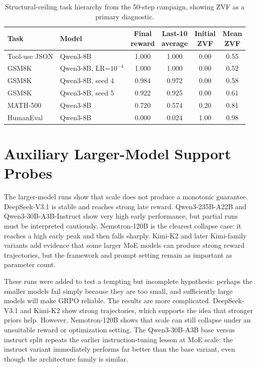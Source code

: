 \documentclass[12pt,a4paper]{report}
\begin{document}
\begin{table}[ht]
\centering
\caption{Structural-ceiling task hierarchy from the 50-step campaign, showing ZVF as a primary diagnostic.}
\label{tab:task-hierarchy}
\small
\setlength{\tabcolsep}{3pt}
\begin{tabular}{@{}p{}p{}cccc@{}}
\toprule
Task & Model & \shortstack{Final\\reward} & \shortstack{Last-10\\average} & \shortstack{Initial\\ZVF} & \shortstack{Mean\\ZVF}\\
\midrule
Tool-use JSON & Qwen3-8B & 1.000 & 1.000 & 0.00 & 0.55\\
GSM8K & Qwen3-8B, LR=$10^{-4}$ & 1.000 & 1.000 & 0.00 & 0.52\\
GSM8K & Qwen3-8B, seed 4 & 0.984 & 0.972 & 0.00 & 0.58\\
GSM8K & Qwen3-8B, seed 5 & 0.922 & 0.925 & 0.00 & 0.61\\
MATH-500 & Qwen3-8B & 0.720 & 0.574 & 0.20 & 0.81\\
HumanEval & Qwen3-8B & 0.000 & 0.024 & 1.00 & 0.98\\
\bottomrule
\end{tabular}
\end{table}

\section{Auxiliary Larger-Model Support Probes}
\label{sec:world-class}

The larger-model runs show that scale does not produce a monotonic guarantee. DeepSeek-V3.1 is stable and reaches strong late reward. Qwen3-235B-A22B and Qwen3-30B-A3B-Instruct show very high early performance, but partial runs must be interpreted cautiously. Nemotron-120B is the clearest collapse case: it reaches a high early peak and then falls sharply. Kimi-K2 and later Kimi-family variants add evidence that some larger MoE models can produce strong reward trajectories, but the framework and prompt setting remain as important as parameter count.

These runs were added to test a tempting but incomplete hypothesis: perhaps the smaller models fail simply because they are too small, and sufficiently large models will make GRPO reliable. The results are more complicated. DeepSeek-V3.1 and Kimi-K2 show strong trajectories, which supports the idea that stronger priors help. However, Nemotron-120B shows that scale can still collapse under an unsuitable reward or optimization setting. The Qwen3-30B-A3B base versus instruct split repeats the earlier instruction-tuning lesson at MoE scale: the instruct variant immediately performs far better than the base variant, even though the architecture family is similar.
\end{document}
